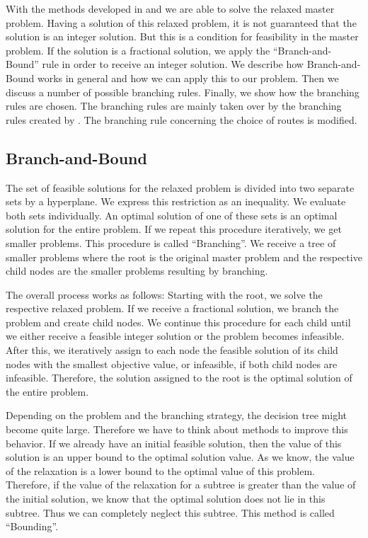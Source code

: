With the methods developed in  and  we are able to solve the relaxed master problem. Having a solution of this relaxed problem, it is not guaranteed that the solution is an integer solution. But this is a condition for feasibility in the master problem. If the solution is a fractional solution, we apply the \enquote{Branch-and-Bound} rule in order to receive an integer solution. We describe how Branch-and-Bound works in general and how we can apply this to our problem. Then we discuss a number of possible branching rules. Finally, we show how the branching rules are chosen. The branching rules are mainly taken over by the branching rules created by \cite{Kaiser}. The branching rule concerning the choice of routes is modified.

\subsection{Branch-and-Bound}

The set of feasible solutions for the relaxed problem is divided into two separate sets by a hyperplane. We express this restriction as an inequality. We evaluate both sets individually. An optimal solution of one of these sets is an optimal solution for the entire problem. If we repeat this procedure iteratively, we get smaller problems. This procedure is called \enquote{Branching}. We receive a tree of smaller problems where the root is the original master problem and the respective child nodes are the smaller problems resulting by branching.

The overall process works as follows: Starting with the root, we solve the respective relaxed problem. If we receive a fractional solution, we branch the problem and create child nodes. We continue this procedure for each child until we either receive a feasible integer solution or the problem becomes infeasible. After this, we iteratively assign to each node the feasible solution of its child nodes with the smallest objective value, or infeasible, if both child nodes are infeasible. Therefore, the solution assigned to the root is the optimal solution of the entire problem.

Depending on the problem and the branching strategy, the decision tree might become quite large. Therefore we have to think about methods to improve this behavior. If we already have an initial feasible solution, then the value of this solution is an upper bound to the optimal solution value. As we know, the value of the relaxation is a lower bound to the optimal value of this problem. Therefore, if the value of the relaxation for a subtree is greater than the value of the initial solution, we know that the optimal solution does not lie in this subtree. Thus we can completely neglect this subtree. This method is called \enquote{Bounding}.

